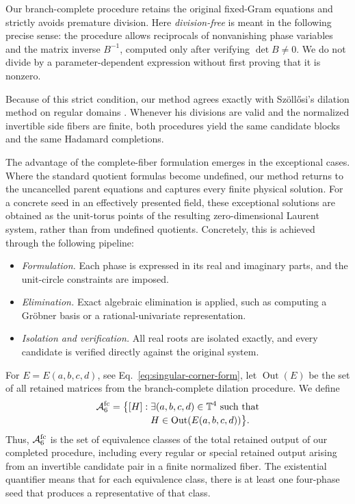 Our branch-complete procedure retains the original fixed-Gram equations and strictly avoids premature division. Here \emph{division-free} is meant in the following precise sense: the procedure allows reciprocals of nonvanishing phase variables and the matrix inverse $B^{-1}$, computed only after verifying $\det B\neq0$. We do not divide by a parameter-dependent expression without first proving that it is nonzero.

Because of this strict condition, our method agrees exactly with Sz\"oll\H{o}si's dilation method on regular domains \cite{Szollosi2012FourParameter}. Whenever his divisions are valid and the normalized invertible side fibers are finite, both procedures yield the same candidate blocks and the same Hadamard completions.

The advantage of the complete-fiber formulation emerges in the exceptional cases. Where the standard quotient formulas become undefined, our method returns to the uncancelled parent equations and captures every finite physical solution. For a concrete seed in an effectively presented field, these exceptional solutions are obtained as the unit-torus points of the resulting zero-dimensional Laurent system, rather than from undefined quotients. Concretely, this is achieved through the following pipeline:
\begin{itemize}
\item \emph{Formulation.} Each phase is expressed in its real and imaginary parts, and the unit-circle constraints are imposed.
\item \emph{Elimination.} Exact algebraic elimination is applied, such as computing a Gr\"obner basis or a rational-univariate representation.
\item \emph{Isolation and verification.} All real roots are isolated exactly, and every candidate is verified directly against the original system.
\end{itemize}

\begin{definition}
\label{def:completed-output}
For $E=E(a,b,c,d)$, see Eq.~\ref{eq:singular-corner-form}, let $\operatorname{Out}(E)$ be the set of all retained matrices from the branch-complete dilation procedure.
We define
\begin{equation}
\begin{aligned}
\mathcal A_6^{\mathrm{fc}}=\bigl\{[H]:\;&\exists(a,b,c,d)\in\mathbb T^4
\text{ such that}\\[-2pt]
&H\in\operatorname{Out}(E(a,b,c,d))\bigr\}.
\end{aligned}
\label{eq:Gdefinition}
\end{equation}
Thus, $\mathcal A_6^{\mathrm{fc}}$ is the set of equivalence classes of the total retained output of our completed procedure, including every regular or special retained output arising from an invertible candidate pair in a finite normalized fiber. The existential quantifier means that for each equivalence class, there is at least one four-phase seed that produces a representative of that class. 
\end{definition}


